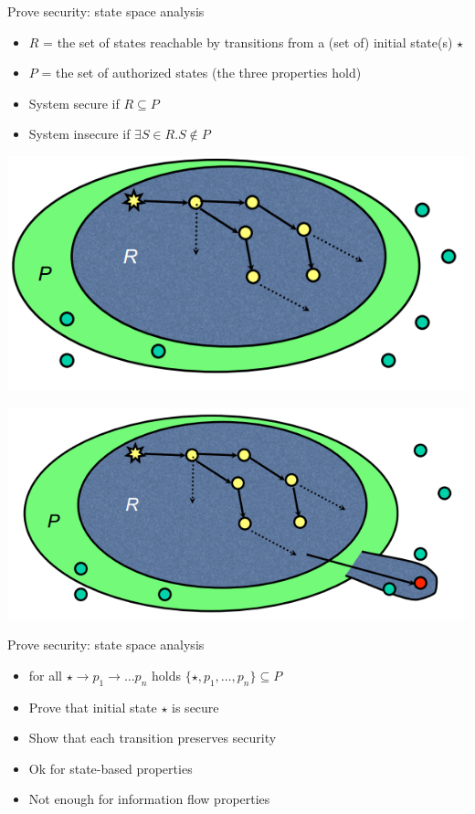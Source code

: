 \documentclass{beamer}
\begin{document}
\begin{frame}{Prove security: state space analysis}
  \begin{itemize}
  \item $R$ = the set of states reachable by transitions from a
    (set of) initial state(s) $\star$
  \item $P$ = the set of authorized states (the three properties hold)
  \item System secure if $R \subseteq P$
  \item System insecure if $\exists S \in R. S \not \in P$
  \end{itemize}
   {
  \begin{center}
    \includegraphics[width=0.5\linewidth]{secure_system}
  \end{center}}
   {
  \begin{center}
    \includegraphics[width=0.5\linewidth]{insicure_system}
  \end{center}}
\end{frame}

\begin{frame}{Prove security: state space analysis}
  \begin{itemize}
  \item for all $\star \rightarrow p_1 \rightarrow \dots p_n$ holds
    $\{\star, p_1, \dots, p_n\} \subseteq P$
  \item Prove that initial state $\star$ is secure 
  \item Show that each transition preserves security
  \item<2-> Ok for state-based properties
  \item<2-> Not enough for information flow properties
  \end{itemize}
\end{frame}
\end{document}
